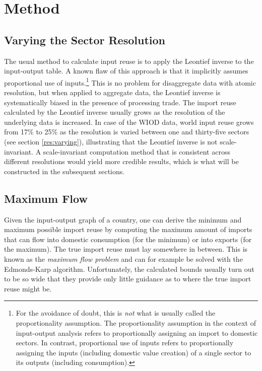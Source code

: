 \documentclass[english]{uzhpub}
\begin{document}
\section{Method}
\label{sec:method}

\subsection{Varying the Sector Resolution}
\label{Varying}
The usual method to calculate input reuse is to apply the Leontief inverse to the input-output table. A known flaw of this approach is that it implicitly assumes proportional use of inputs.\footnote{For the avoidance of doubt, this is \emph{not} what is usually called the proportionality assumption. The proportionality assumption in the context of input-output analysis refers to proportionally assigning an import to domestic sectors. In contrast, proportional use of inputs refers to proportionally assigning the inputs (including domestic value creation) of a single sector to its outputs (including consumption).} This is no problem for disaggregate data with atomic resolution, but when applied to aggregate data, the Leontief inverse is systematically biased in the presence of processing trade. The import reuse calculated by the Leontief inverse usually grows as the resolution of the underlying data is increased. In case of the WIOD data, world input reuse grows from 17\% to 25\% as the resolution is varied between one and thirty-five sectors (see section \ref{res:varying}), illustrating that the Leontief inverse is not scale-invariant. A scale-invariant computation method that is consistent across different resolutions would yield more credible results, which is what will be constructed in the subsequent sections.

\subsection{Maximum Flow}
Given the input-output graph of a country, one can derive the minimum and maximum possible import reuse by computing the maximum amount of imports that can flow into domestic consumption (for the minimum) or into exports (for the maximum). The true import reuse must lay somewhere in between. This is known as the \emph{maximum flow problem} and can for example be solved with the Edmonds-Karp algorithm. \citep{edmonds1972theoretical} Unfortunately, the calculated bounds usually turn out to be so wide that they provide only little guidance as to where the true import reuse might be.
\end{document}
